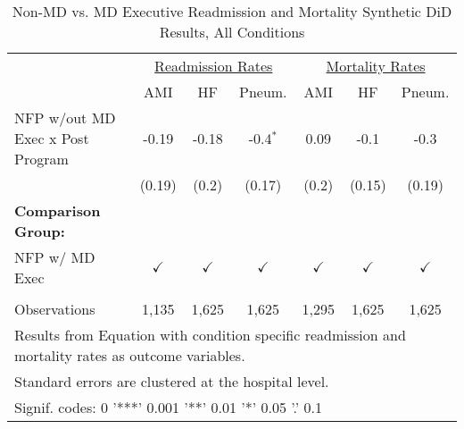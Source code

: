 \begin{table}[ht!]

\caption{\label{tab:MD_noMD_readmort_condition_synth}Non-MD vs. MD Executive Readmission and Mortality Synthetic DiD Results, All Conditions}
\centering
\begin{tabular}[t]{lcccccc}
\toprule
\multicolumn{1}{c}{\underline{ }} & \multicolumn{3}{c}{\underline{Readmission Rates}} & \multicolumn{3}{c}{\underline{Mortality Rates}} \\
 & AMI & HF & Pneum. & AMI & HF & Pneum.\\
\midrule
NFP w/out MD Exec x Post Program & -0.19 & -0.18 & -0.4$^{*}$ & 0.09 & -0.1 & -0.3\\
 & (0.19) & (0.2) & (0.17) & (0.2) & (0.15) & (0.19)\\
\textbf{Comparison Group:} &  &  &  &  &  & \\
NFP w/ MD Exec & $\checkmark$ & $\checkmark$ & $\checkmark$ & $\checkmark$ & $\checkmark$ & $\checkmark$\\
 &  &  &  &  &  & \\
\addlinespace
Observations & 1,135 & 1,625 & 1,625 & 1,295 & 1,625 & 1,625\\
\bottomrule
\multicolumn{7}{l}{\textsuperscript{} Results from Equation with condition specific readmission and mortality rates as outcome variables.}\\
\multicolumn{7}{l}{\textsuperscript{} Standard errors are clustered at the hospital level.}\\
\multicolumn{7}{l}{\textsuperscript{} Signif. codes: 0 '***' 0.001 '**' 0.01 '*' 0.05 '.' 0.1}\\
\end{tabular}
\end{table}
